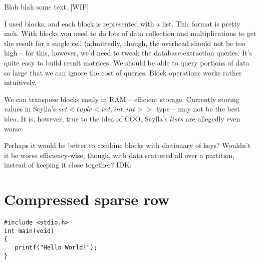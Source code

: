 \documentclass{article}
\begin{document}
Blah blah some text. [WIP]

I used blocks, and each block is represented with a list.
This format is pretty meh. With blocks you need to do lots of data collection and multiplications to get the result for a single cell (admittedly, though, the overhead should not be too high -- for this, however, we'd need to tweak the database extraction queries. It's quite easy to build result matrices. We should be able to query portions of data so large that we can ignore the cost of queries. Block operations works rather intuitively. 

We can transpose blocks easily in RAM -- efficient storage.
Currently storing values in Scylla's $set<tuple<int, int, int>>$ type -- may not be the best idea. It is, however, true to the idea of COO. Scylla's $lists$ are allegedly even worse.

Perhaps it would be better to combine blocks with dictionary of keys? Wouldn't it be worse efficiency-wise, though, with data scattered all over a partition, instead of keeping it close together? IDK.

\pagebreak
\section{Compressed sparse row}


\begin{lstlisting}[style=CStyle]
#include <stdio.h>
int main(void)
{
   printf("Hello World!"); 
}
\end{lstlisting}
\end{document}
